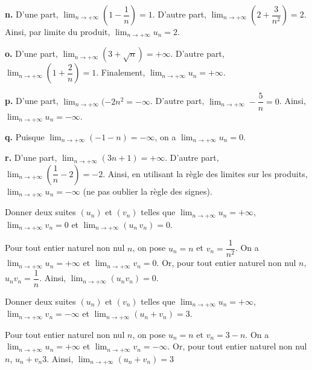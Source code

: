 \documentclass[11pt,fleqn]{book} %
\begin{document}
\begin{solution}
\textbf{n.} D'une part, $\displaystyle\lim _{n\to + \infty} \left( 1-\dfrac{1}{n}\right)=1$. D'autre part, $\displaystyle\lim _{n\to + \infty} \left(2+\dfrac{3}{n^2}\right)=2$. \\Ainsi, par limite du produit, $\displaystyle\lim _{n\to + \infty} u_n=2$.

\textbf{o.} D'une part, $\displaystyle\lim _{n\to + \infty} (3+\sqrt{n})=+\infty$. D'autre part, $\displaystyle\lim _{n\to + \infty} \left(1+\dfrac{2}{n}\right)=1$. Finalement, $\displaystyle\lim _{n\to + \infty}u_n=+\infty $.

\textbf{p.} D'une part, $\displaystyle\lim _{n\to + \infty}(-2n^2=-\infty$. D'autre part, $\displaystyle\lim _{n\to + \infty} -\dfrac{5}{n}=0$. Ainsi, $\displaystyle\lim _{n\to + \infty} u_n=-\infty$.

\textbf{q.} Puisque $\displaystyle\lim _{n\to + \infty}(-1-n)=-\infty$, on a $\displaystyle\lim _{n\to + \infty}u_n=0$.

\textbf{r.} D'une part, $\displaystyle\lim _{n\to + \infty}(3n+1)=+\infty$. D'autre part, $\displaystyle\lim _{n\to + \infty}\left(\dfrac{1}{n}-2\right)=-2$. Ainsi, en utilisant la règle des limites sur les produits, $\displaystyle\lim _{n\to + \infty}u_n=-\infty$ (ne pas oublier la règle des signes).\end{solution}



\begin{exercise}Donner deux suites $(u_n)$ et $(v_n)$ telles que $\displaystyle \lim_{n \to +\infty}u_n=+\infty$, $\displaystyle \lim_{n \to +\infty} v_n = 0$ et $\displaystyle \lim_{n \to +\infty} (u_n\,v_n)=0$.\end{exercise}
\begin{solution}Pour tout entier naturel non nul $n$, on pose $u_n=n$ et $v_n=\dfrac{1}{n^2}$. On a $\displaystyle\lim_{n \to+\infty}u_n=+\infty$ et $\displaystyle\lim_{n \to+\infty}v_n=0$. Or, pour tout entier naturel non nul $n$, $u_nv_n=\dfrac{1}{n}$. Ainsi, $\displaystyle\lim_{n \to+\infty}(u_nv_n)=0$.\end{solution}



\begin{exercise} Donner deux suites $(u_n)$ et $(v_n)$ telles que $\displaystyle \lim_{n \to +\infty}u_n=+\infty$, $\displaystyle \lim_{n \to +\infty} v_n = -\infty$ et $\displaystyle \lim_{n \to +\infty} (u_n + v_n)=3$.\end{exercise}
\begin{solution}Pour tout entier naturel non nul $n$, on pose $u_n=n$ et $v_n=3-n$. On a $\displaystyle\lim_{n \to+\infty}u_n=+\infty$ et $\displaystyle\lim_{n \to+\infty}v_n=-\infty$. Or, pour tout entier naturel non nul $n$, $u_n+v_n3$. Ainsi, $\displaystyle\lim_{n \to+\infty}(u_n+v_n)=3$\end{solution}
\end{document}

